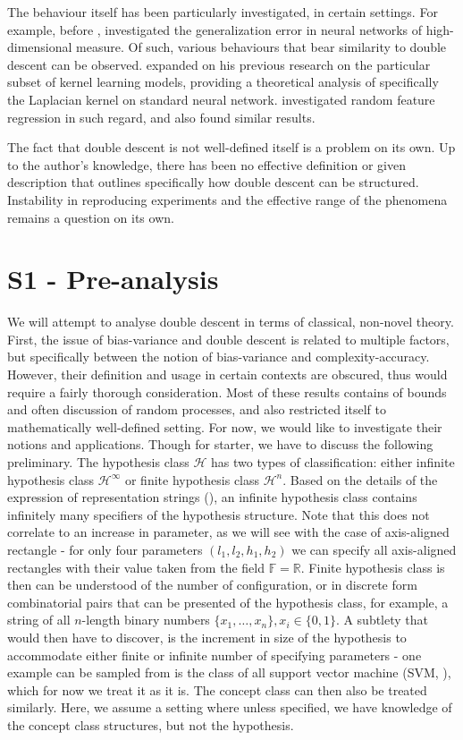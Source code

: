 \documentclass[10pt]{article}
\begin{document}
The behaviour itself has been particularly investigated, in certain settings. For example, before \cite{belkin_reconciling_2019}, \cite{advani2017highdimensionaldynamicsgeneralizationerror} investigated the generalization error in neural networks of high-dimensional measure. Of such, various behaviours that bear similarity to double descent can be observed. \cite{belkin2018understanddeeplearningneed} expanded on his previous research on the particular subset of kernel learning models, providing a theoretical analysis of specifically the Laplacian kernel on standard neural network. \cite{mei2020generalizationerrorrandomfeatures} investigated random feature regression in such regard, and also found similar results. 

The fact that double descent is not well-defined itself is a problem on its own. Up to the author's knowledge, there has been no effective definition or given description that outlines specifically how double descent can be structured. Instability in reproducing experiments and the effective range of the phenomena remains a question on its own. 
\clearpage

\section{S1 - Pre-analysis}
We will attempt to analyse double descent in terms of classical, non-novel theory. First, the issue of bias-variance and double descent is related to multiple factors, but specifically between the notion of bias-variance and complexity-accuracy. However, their definition and usage in certain contexts are obscured, thus would require a fairly thorough consideration. Most of these results contains of bounds and often discussion of random processes, and also restricted itself to mathematically well-defined setting. For now, we would like to investigate their notions and applications. Though for starter, we have to discuss the following preliminary. The hypothesis class $\mathcal{H}$ has two types of classification: either infinite hypothesis class $\mathcal{H}^{\infty}$ or finite hypothesis class $\mathcal{H}^{n}$. Based on the details of the expression of representation strings (\cite{10.5555/200548}), an infinite hypothesis class contains infinitely many specifiers of the hypothesis structure. Note that this does not correlate to an increase in parameter, as we will see with the case of axis-aligned rectangle - for only four parameters $(l_{1},l_{2},h_{1},h_2)$ we can specify all axis-aligned rectangles with their value taken from the field $\mathbb{F}=\mathbb{R}$. Finite hypothesis class is then can be understood of the number of configuration, or in discrete form combinatorial pairs that can be presented of the hypothesis class, for example, a string of all $n$-length binary numbers $\{x_{1},\dots,x_{n}\}, x_{i}\in \{0,1\}$. A subtlety that would then have to discover, is the increment in size of the hypothesis to accommodate either finite or infinite number of specifying parameters - one example can be sampled from is the class of all support vector machine (SVM, \cite{Vapnik1999-VAPTNO}), which for now we treat it as it is. The concept class can then also be treated similarly. Here, we assume a setting where unless specified, we have knowledge of the concept class structures, but not the hypothesis. 
\end{document}
